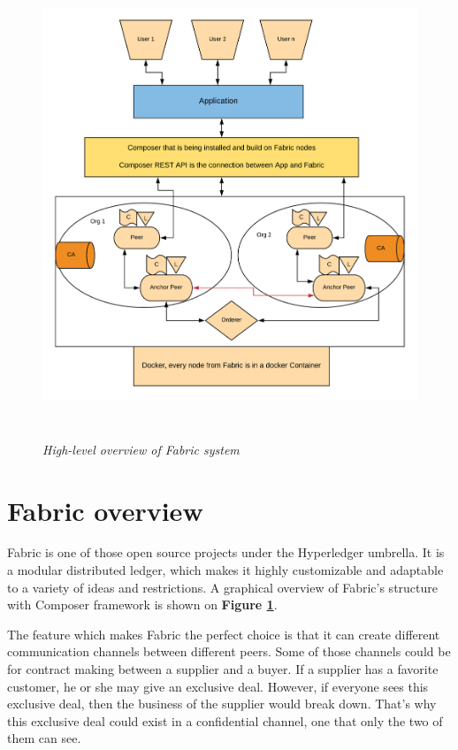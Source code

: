 \documentclass[a4paper,11pt]{report}
\begin{document}
\begin{figure}[h]
\centering
  \includegraphics[height=14cm,width=16cm]{Flowdiagram.png}
  \caption{\textit{High-level overview of Fabric system}}
  \label{highleveloverview}
\end{figure}


\section{Fabric overview}
	Fabric is one of those open source projects under the Hyperledger umbrella. It is a modular distributed ledger, which makes it highly customizable and adaptable to a variety of ideas and restrictions. A graphical overview of Fabric's structure with Composer framework is shown on \textbf{Figure \ref{highleveloverview}}.
	
The feature which makes Fabric the perfect choice is that it can create different communication channels between different peers. Some of those channels could be for contract making between a supplier and a buyer. If a supplier has a favorite customer, he or she may give an exclusive deal. However, if everyone sees this exclusive deal, then the business of the supplier would break down. That's why this exclusive deal could exist in a confidential channel, one that only the two of them can see. 
\end{document}
